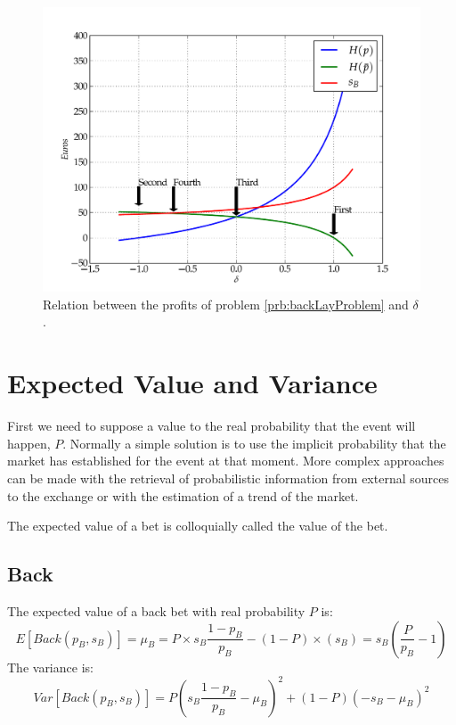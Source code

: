 \documentclass{article}
\begin{document}
\begin{figure}[htbp]
\centering
\includegraphics[width=0.8\linewidth]{imgs/biastrade.pdf}
\caption{Relation between the profits of problem
                                \ref{prb:backLayProblem} and $\delta$.}
\label{fig:biastrade}
\end{figure}




\appendix
\section{Expected Value and Variance}
\label{apdx:expectedvariance}
First we need to suppose a value to the real probability that the event will happen, $P$. Normally a simple solution is to use the implicit probability that the market has established for the event at that moment. More complex approaches can be made with the retrieval of probabilistic information from external sources to the exchange or with the estimation of a trend of the market.

The expected value of a bet is colloquially called the value of the bet.

\subsection{Back}
The expected value of a back bet with real probability $P$ is:
\[
E \left[ Back(p_{B},s_{B}) \right] = \mu_{B} = P \times s_{B}
\frac{1-p_{B}}{p_{B}} - (1-P) \times (s_{B}) = s_{B}
                                       \left( \frac{P}{p_{B}}-1 \right)
\]
The variance is:
\[
Var \left[ Back(p_{B},s_{B}) \right] = P \left(
s_{B}\frac{1-p_{B}}{p_{B}} - \mu_{B} \right)^{2} + (1-P) \left( 
                                          - s_{B} - \mu_{B} \right)^{2}
\]
\end{document}
